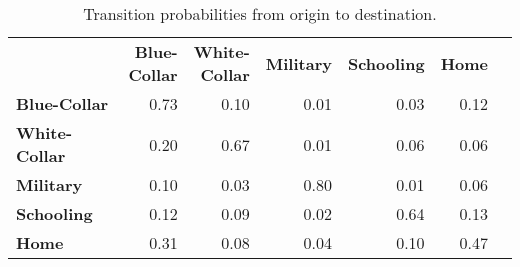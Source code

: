 \begin{ThreePartTable}

	\begin{longtable}[c]{@{}lrrrrrr@{}}
		\caption{Transition probabilities from origin to destination.}
		\label{tab:TransitionProbabilitiesOriginToDestination}

		\setlength\extrarowheight{2.5pt}
		
		\\
		\toprule
   & \thead{\textbf{Blue-} \\ \textbf{Collar}}    & \thead{\textbf{White-} \\ \textbf{Collar}}  & \textbf{Military} & \textbf{Schooling} & \textbf{Home}   \\ \midrule
		\endfirsthead
		
\textbf{Blue-Collar}	&	0.73	&	0.10	&	0.01	&	0.03	&	0.12	\\
\textbf{White-Collar	} &	0.20	&	0.67	&	0.01	&	0.06	&	0.06	\\
\textbf{Military	} &	0.10	&	0.03	&	0.80	&	0.01	&	0.06	\\
\textbf{Schooling}	&	0.12	&	0.09	&	0.02	&	0.64	&	0.13	\\
\textbf{Home	} &	0.31	&	0.08	&	0.04	&	0.10	&	0.47	\\
  \bottomrule
	\end{longtable}
\end{ThreePartTable}
